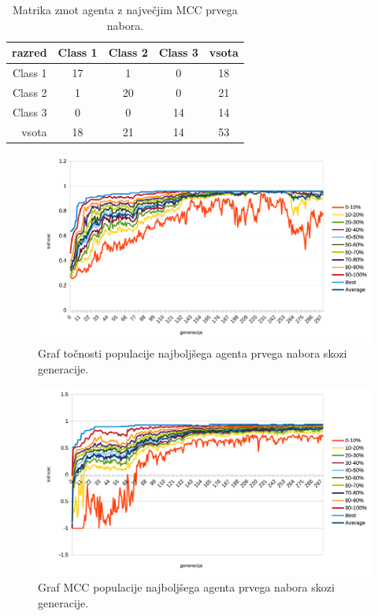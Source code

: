 \begin{table}[H]
    \centering
    \caption{Matrika zmot agenta z največjim MCC prvega nabora.}
    \begin{tabular}{||rcccc||}
        \hline
        razred  & Class 1 & Class 2 & Class 3 & vsota \\ \hline
        Class 1 & 17      & 1       & 0       & 18    \\ \hline
        Class 2 & 1       & 20      & 0       & 21    \\ \hline
        Class 3 & 0       & 0       & 14      & 14    \\ \hline
        vsota   & 18      & 21      & 14      & 53    \\ \hline
    \end{tabular}
    \label{tab:wine_mcc_1}
\end{table}

\begin{figure}[H]
    \begin{center}
        \includegraphics[width=13cm]{wine/1/acc}
    \end{center}
    \caption{Graf točnosti populacije najboljšega agenta prvega nabora skozi generacije.}
    \label{fig:wine_acc_1}
\end{figure}

\begin{figure}[H]
    \begin{center}
        \includegraphics[width=13cm]{wine/1/mcc}
    \end{center}
    \caption{Graf MCC populacije najboljšega agenta prvega nabora skozi generacije.}
    \label{fig:wine_mcc_1}
\end{figure}

